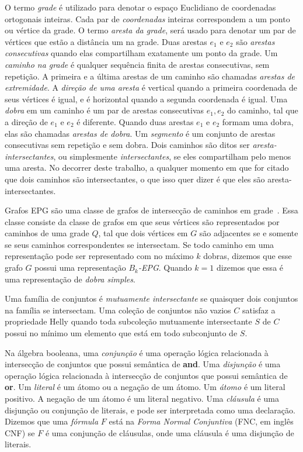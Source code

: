 O termo \emph{grade} é utilizado para denotar o espaço Euclidiano de coordenadas ortogonais inteiras. Cada par de \emph{coordenadas} inteiras correspondem a um ponto ou vértice da grade. O termo \emph{aresta da grade}, será usado para denotar um par de vértices que estão a distância um na grade. Duas arestas $e_1$ e $e_2$ são \emph{arestas consecutivas} quando elas compartilham exatamente um ponto da grade.
 Um \emph{caminho na grade} é qualquer sequência finita de arestas consecutivas, sem repetição. A primeira e a última arestas de um caminho são chamadas \emph{arestas de extremidade}.
A \emph{direção de uma aresta} é vertical quando a primeira coordenada de seus vértices é igual, e é horizontal quando a segunda coordenada é igual. Uma \emph {dobra} em um caminho é um par de arestas consecutivas $ e_1, e_2 $ do caminho, tal que a direção de $ e_1$ e $ e_2$ é diferente. Quando duas arestas $ e_1$ e $e_2 $ formam uma dobra, elas são chamadas \emph {arestas de dobra}. Um \emph {segmento} é um conjunto de arestas consecutivas sem repetição e sem dobra. %
 Dois caminhos são ditos ser   \emph{aresta-intersectantes}, ou simplesmente  \emph{intersectantes}, se eles compartilham pelo menos uma aresta. %
 No decorrer deste trabalho, a qualquer momento em que for citado que dois caminhos são intersectantes, o que isso quer dizer é que eles são aresta-intersectantes. 
 
Grafos EPG são uma classe de grafos de intersecção de caminhos em grade~\cite{golumbic2009}. Essa classe consiste da classe de grafos em que seus vértices são representados por caminhos de uma grade $ Q $, tal que dois vértices em  $ G $ são adjacentes se e somente se seus caminhos correspondentes se intersectam. Se todo caminho em uma representação pode ser representado com no máximo $ k $ dobras, dizemos que esse grafo $ G $ possui uma representação \emph{ $ B_k$-EPG}. Quando $ k = 1 $ dizemos que essa é uma representação de \emph{dobra simples}.

Uma família de conjuntos é  \emph{mutuamente intersectante} se quaisquer dois conjuntos na família se intersectam. Uma coleção de conjuntos não vazios $C$ satisfaz a propriedade Helly quando toda subcoleção mutuamente intersectante $S$ de $ C $ possui no mínimo um elemento que está em todo subconjunto de $S$.

Na álgebra booleana, uma \emph{conjunção} é uma operação lógica relacionada à intersecção de conjuntos que possui semântica de \textbf{and}. Uma \emph{disjunção} é uma operação lógica relacionada à intersecção de conjuntos que possui semântica de \textbf{or}. Um \emph{literal} é um átomo ou a negação de um átomo. Um \emph{átomo} é um literal positivo. A negação de um átomo é um literal negativo. Uma \emph{cláusula} é uma disjunção ou conjunção de literais, e pode ser interpretada como uma declaração. Dizemos que uma \emph{fórmula} $F$ está na \emph{Forma Normal Conjuntiva} (FNC, em inglês CNF) se $F$ é uma conjunção de cláusulas, onde uma cláusula é uma disjunção de literais.

